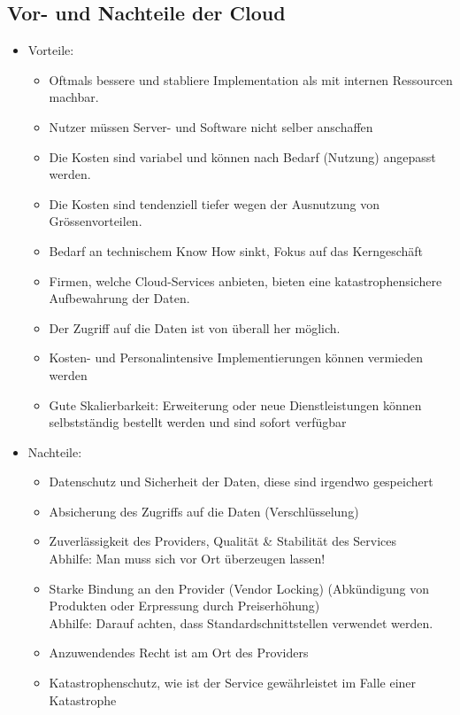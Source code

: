 \subsection{Vor- und Nachteile der Cloud}
\begin{itemize}
	\item Vorteile:
	\begin{itemize}
		\item Oftmals bessere und stabliere Implementation als mit internen Ressourcen machbar.
		\item Nutzer müssen Server- und Software nicht selber anschaffen
		\item Die Kosten sind variabel und können nach Bedarf (Nutzung) angepasst werden.
		\item Die Kosten sind tendenziell tiefer wegen der Ausnutzung von Grössenvorteilen.
		\item Bedarf an technischem Know How sinkt, Fokus auf das Kerngeschäft
		\item Firmen, welche Cloud-Services anbieten, bieten eine katastrophensichere Aufbewahrung der Daten.
		\item Der Zugriff auf die Daten ist von überall her möglich.
		\item Kosten- und Personalintensive Implementierungen können vermieden werden
		\item Gute Skalierbarkeit: Erweiterung oder neue Dienstleistungen können selbstständig bestellt werden und sind sofort verfügbar
	\end{itemize}
	\item Nachteile:
	\begin{itemize}
		\item Datenschutz und Sicherheit der Daten, diese sind irgendwo gespeichert
		\item Absicherung des Zugriffs auf die Daten (Verschlüsselung)
		\item Zuverlässigkeit des Providers, Qualität \& Stabilität des Services \\
			Abhilfe: Man muss sich vor Ort überzeugen lassen!
		\item Starke Bindung an den Provider (Vendor Locking) (Abkündigung von Produkten oder Erpressung durch Preiserhöhung) \\
			Abhilfe: Darauf achten, dass Standardschnittstellen verwendet werden.
		\item Anzuwendendes Recht ist am Ort des Providers
		\item Katastrophenschutz, wie ist der Service gewährleistet im Falle einer Katastrophe
	\end{itemize}
\end{itemize}
